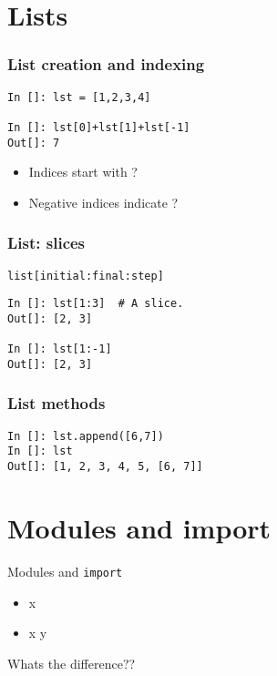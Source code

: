 \documentclass[14pt,compress]{beamer}
\newcounter{time}
\newcommand{\inctime}[1]{\addtocounter{time}{#1}{\tiny \thetime\ m}}
\newcommand{\typ}[1]{\lstinline{#1}}
\newcommand{\kwrd}[1]{ \texttt{\textbf{\color{blue}{#1}}}  }
\begin{document}
\section{Lists}

\begin{frame}[fragile]
  \frametitle{List creation and indexing}
\begin{lstlisting}
In []: lst = [1,2,3,4] 

In []: lst[0]+lst[1]+lst[-1]
Out[]: 7
\end{lstlisting}
\begin{itemize}
  \item Indices start with ?
  \item Negative indices indicate ?
  \end{itemize}
\end{frame}

\begin{frame}[fragile]
  \frametitle{List: slices}
  \typ{list[initial:final:step]}
\begin{lstlisting}
In []: lst[1:3]  # A slice.
Out[]: [2, 3]

In []: lst[1:-1]
Out[]: [2, 3]
\end{lstlisting}
\end{frame}

\begin{frame}[fragile]
  \frametitle{List methods}
\begin{lstlisting}
In []: lst.append([6,7])
In []: lst
Out[]: [1, 2, 3, 4, 5, [6, 7]]
\end{lstlisting}
\inctime{10}
\end{frame}

\section{Modules and import}
\begin{frame}{Modules and \typ{import}}
  \begin{itemize}
    \item \kwrd{import} x
    \item \kwrd{from} x \kwrd{import} y
  \end{itemize}
Whats the difference??
\inctime{5}
\end{frame}
\end{document}
